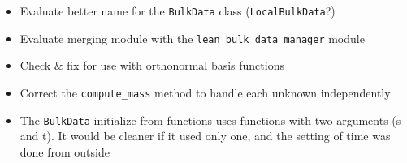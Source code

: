 \begin{todobox}
\begin{itemize}
	\item Evaluate better name for the {\tt BulkData} class ({\tt LocalBulkData}?)
	\item Evaluate merging module with the {\tt lean\_bulk\_data\_manager} module
	\item Check \& fix for use with orthonormal basis functions
	\item Correct the {\tt compute\_mass} method to handle each unknown independently
	\item The {\tt BulkData} initialize from functions uses functions with two arguments (s and t). It would be cleaner if it used only one, and the setting of time was done from outside
\end{itemize}
\end{todobox}


